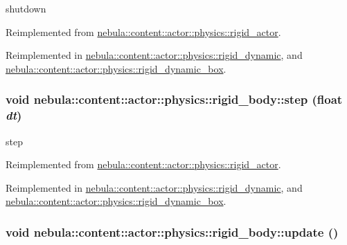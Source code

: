shutdown 

Reimplemented from \hyperlink{classnebula_1_1content_1_1actor_1_1physics_1_1rigid__actor_a19cfcb68b5be57574d96ffe856131aed}{nebula::content::actor::physics::rigid\_\-actor}.

Reimplemented in \hyperlink{classnebula_1_1content_1_1actor_1_1physics_1_1rigid__dynamic_a712d45c781944f79af0d074062674e20}{nebula::content::actor::physics::rigid\_\-dynamic}, and \hyperlink{classnebula_1_1content_1_1actor_1_1physics_1_1rigid__dynamic__box_a3f9abbce238ad6bee7363ab9a849512c}{nebula::content::actor::physics::rigid\_\-dynamic\_\-box}.\hypertarget{classnebula_1_1content_1_1actor_1_1physics_1_1rigid__body_a480452963a16809aef9a8bd80bce1d16}{
\subsubsection[{step}]{\setlength{\rightskip}{0pt plus 5cm}void nebula::content::actor::physics::rigid\_\-body::step (float {\em dt})}}
\label{classnebula_1_1content_1_1actor_1_1physics_1_1rigid__body_a480452963a16809aef9a8bd80bce1d16}


step 

Reimplemented from \hyperlink{classnebula_1_1content_1_1actor_1_1physics_1_1rigid__actor_a8d53c36044b639537cecff87ef9f84f1}{nebula::content::actor::physics::rigid\_\-actor}.

Reimplemented in \hyperlink{classnebula_1_1content_1_1actor_1_1physics_1_1rigid__dynamic_a23e957b179440185cfc15750b47f3a5c}{nebula::content::actor::physics::rigid\_\-dynamic}, and \hyperlink{classnebula_1_1content_1_1actor_1_1physics_1_1rigid__dynamic__box_a849dd1aec8bf8be223dc3d7d9c1f81b5}{nebula::content::actor::physics::rigid\_\-dynamic\_\-box}.\hypertarget{classnebula_1_1content_1_1actor_1_1physics_1_1rigid__body_a7c8c0d4a581a36f3015912d1d73166f6}{
\subsubsection[{update}]{\setlength{\rightskip}{0pt plus 5cm}void nebula::content::actor::physics::rigid\_\-body::update ()}}
\label{classnebula_1_1content_1_1actor_1_1physics_1_1rigid__body_a7c8c0d4a581a36f3015912d1d73166f6}


